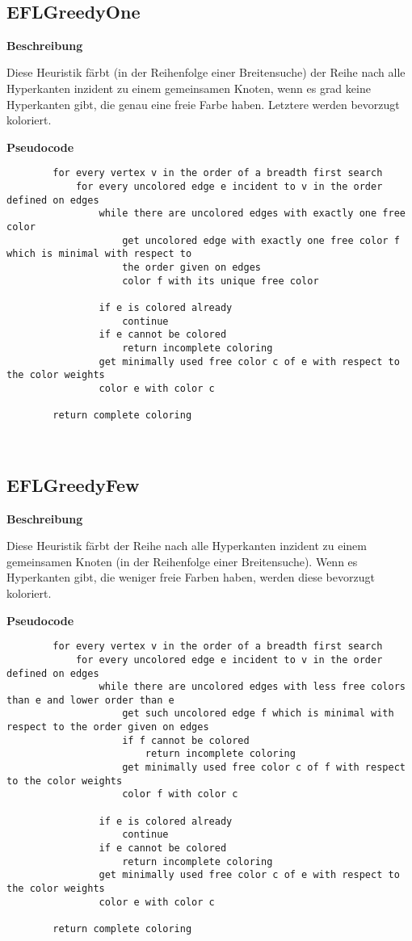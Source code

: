 \documentclass{article}
\begin{document}
	~\newline
	~\newline
	
	\subsection{EFLGreedyOne}
	
	\textbf{Beschreibung}
	
	Diese Heuristik färbt (in der Reihenfolge einer Breitensuche) der Reihe nach alle Hyperkanten inzident zu einem gemeinsamen Knoten, wenn es grad keine Hyperkanten gibt, die genau eine freie Farbe haben. Letztere werden bevorzugt koloriert.
	
	\textbf{Pseudocode}
	\begin{verbatim}    
		for every vertex v in the order of a breadth first search
		    for every uncolored edge e incident to v in the order defined on edges
		        while there are uncolored edges with exactly one free color
		            get uncolored edge with exactly one free color f which is minimal with respect to 
		            the order given on edges
		            color f with its unique free color
		            
		        if e is colored already
		            continue
		        if e cannot be colored
		            return incomplete coloring
		        get minimally used free color c of e with respect to the color weights
		        color e with color c
				        
		return complete coloring
	\end{verbatim}
	
	~\newpage
	\subsection{EFLGreedyFew}
	
	\textbf{Beschreibung}
	
	Diese Heuristik färbt der Reihe nach alle Hyperkanten inzident zu einem gemeinsamen Knoten (in der Reihenfolge einer Breitensuche). Wenn es Hyperkanten gibt, die weniger freie Farben haben, werden diese bevorzugt koloriert.
	
	\textbf{Pseudocode}
	\begin{verbatim}  
		for every vertex v in the order of a breadth first search
		    for every uncolored edge e incident to v in the order defined on edges
		        while there are uncolored edges with less free colors than e and lower order than e
		            get such uncolored edge f which is minimal with respect to the order given on edges
		            if f cannot be colored
		                return incomplete coloring
		            get minimally used free color c of f with respect to the color weights
		            color f with color c
		            
		        if e is colored already
		            continue
		        if e cannot be colored
		            return incomplete coloring
		        get minimally used free color c of e with respect to the color weights
		        color e with color c
				        
		return complete coloring
	\end{verbatim}
	
\end{document}
